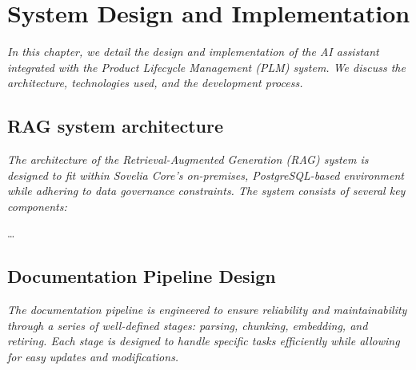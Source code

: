 \chapter{System Design and Implementation}
\label{ch:system-design-and-implementation}

\textit{In this chapter, we detail the design and implementation of the AI assistant integrated with the Product Lifecycle Management (PLM) system. We discuss the architecture, technologies used, and the development process.}

\section{RAG system architecture}
\label{sec:rag-system-architecture}

\textit{The architecture of the Retrieval-Augmented Generation (RAG) system is designed to fit within Sovelia Core's on-premises, PostgreSQL-based environment while adhering to data governance constraints. The system consists of several key components:}

\dots

\section{Documentation Pipeline Design}
\label{sec:documentation-pipeline-design}

\textit{The documentation pipeline is engineered to ensure reliability and maintainability through a series of well-defined stages: parsing, chunking, embedding, and retiring. Each stage is designed to handle specific tasks efficiently while allowing for easy updates and modifications.}
